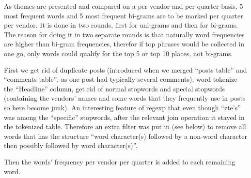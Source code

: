 \documentclass[]{article}
\begin{document}
As themes are presented and compared on a per vendor and per quarter
basis, 5 most frequent words and 5 most frequent bi-grams are to be
marked per quarter per vendor. It is done in two rounds, first for
uni-grams and then for bi-grams. The reason for doing it in two separate
rounds is that naturally word frequencies are higher than bi-gram
frequencies, therefor if top phrases would be collected in one go, only
words could qualify for the top 5 or top 10 places, not bi-grams.

First we get rid of duplicate posts (introduced when we merged ``posts
table'' and ``comments table'', as one post had typically several
comments), word tokenize the ``Headline'' column, get rid of normal
stopwords and special stopwords (containing the vendors' names and some
words that they frequently use in posts so here become junk). An
interesting feature of regexp that even though ``zte's'' was among the
``specific'' stopwords, after the relevant join operation it stayed in
the tokenized table. Therefore an extra filter was put in (see below) to
remove all words that has the structure ``word character(s) followed by
a non-word character then possibly followed by word character(s)''.

Then the words' frequency per vendor per quarter is added to each
remaining word.
\end{document}

